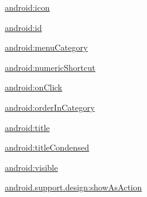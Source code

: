 {\ttfamily \hyperlink{classandroid_1_1support_1_1design_1_1R_1_1styleable_aad27da563931a43a215291fed76d8fc1}{android\+:icon}}

{\ttfamily \hyperlink{classandroid_1_1support_1_1design_1_1R_1_1styleable_afbda85862c50bb6b1d1c07d43301305f}{android\+:id}}

{\ttfamily \hyperlink{classandroid_1_1support_1_1design_1_1R_1_1styleable_a391ab3f07c8b267f8d014751cc656800}{android\+:menu\+Category}}

{\ttfamily \hyperlink{classandroid_1_1support_1_1design_1_1R_1_1styleable_a5776dc6f7dd431ab1dd1ea84537d4015}{android\+:numeric\+Shortcut}}

{\ttfamily \hyperlink{classandroid_1_1support_1_1design_1_1R_1_1styleable_a9484e64b62aa88502a3a5c401944589e}{android\+:on\+Click}}

{\ttfamily \hyperlink{classandroid_1_1support_1_1design_1_1R_1_1styleable_a63a7fd821acd701fe9d619cd623638b6}{android\+:order\+In\+Category}}

{\ttfamily \hyperlink{classandroid_1_1support_1_1design_1_1R_1_1styleable_a763cbf62cbe6f3aa61ca4b0a2ba68494}{android\+:title}}

{\ttfamily \hyperlink{classandroid_1_1support_1_1design_1_1R_1_1styleable_aa151f315fb220476a341678d66a423be}{android\+:title\+Condensed}}

{\ttfamily \hyperlink{classandroid_1_1support_1_1design_1_1R_1_1styleable_af825b4c38a96b3cba91a45cd9f65e9f9}{android\+:visible}}

{\ttfamily \hyperlink{classandroid_1_1support_1_1design_1_1R_1_1styleable_ab142dfa8fe8f756ee789d58e501b7c1b}{android.\+support.\+design\+:show\+As\+Action}}

